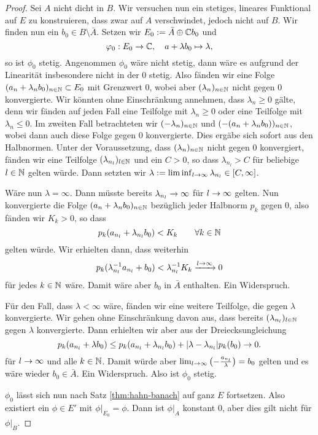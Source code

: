 \begin{proof}
  Sei $A$ nicht dicht in $B$. Wir versuchen nun ein stetiges, lineares
  Funktional auf $E$ zu konstruieren, dass zwar auf $A$ verschwindet,
  jedoch nicht auf $B$. Wir finden nun ein $b_0 \in B \setminus
  \bar A$. Setzen wir $E_0 := \bar A \oplus \mathbb{C} b_0$ und
  \[
  \varphi_0: E_0 \rightarrow \mathbb{C}, \quad a + \lambda b_0 \mapsto \lambda,
  \]
  so ist $\phi_0$ stetig. Angenommen $\phi_0$ wäre nicht stetig, dann
  wäre es aufgrund der Linearität insbesondere nicht in der $0$
  stetig. Also fänden wir eine Folge $(a_n + \lambda_n b_0)_{n \in
    \mathbb{N}} \subset E_0$ mit Grenzwert $0$, wobei aber $(\lambda_n)_{n \in
    \mathbb{N}}$ nicht gegen 0 konvergierte. Wir könnten ohne Einschränkung
  annehmen, dass $\lambda_n \geq 0$ gälte, denn wir fänden auf jeden Fall
  eine Teilfolge mit $\lambda_n \geq 0$ oder eine Teilfolge mit
  $\lambda_n \leq 0$. Im zweiten Fall betrachteten wir $(-\lambda_n)_{n
    \in \mathbb{N}}$ und $(-(a_n + \lambda_n b_0))_{n \in \mathbb{N}}$, wobei dann auch
  diese Folge gegen $0$ konvergierte. Dies ergäbe sich sofort aus den
  Halbnormen. Unter der Voraussetzung, dass $(\lambda_n)_{n\in\mathbb{N}}$
  nicht gegen $0$ konvergiert, fänden wir eine Teilfolge
  $(\lambda_{n_l})_{l\in \mathbb{N}}$ und ein $C > 0$, so dass $\lambda_{n_l}
  > C$ für beliebige $l \in \mathbb{N}$ gelten würde. Dann setzten wir
  $\lambda := \liminf_{l \rightarrow \infty} \lambda_{n_l} \in [C, \infty]$.

  Wäre nun $\lambda = \infty$. Dann müsste bereits
  $\lambda_{n_l} \rightarrow \infty$ für $l \rightarrow \infty$ gelten. Nun
  konvergierte die Folge $(a_n + \lambda_n b_0)_{n \in \mathbb{N}}$ bezüglich
  jeder Halbnorm $p_k$ gegen 0, also fänden wir $K_k > 0$, so dass
  \[
  p_k(a_{n_l} + \lambda_{n_l}b_0) < K_k \qquad \forall k \in \mathbb{N}
  \]
  gelten würde. Wir erhielten dann, dass weiterhin
  \[
  p_k(\lambda_{n_l}^{-1}a_{n_l} + b_0) < \lambda_{n_l}^{-1} K_k
  \xrightarrow{l \rightarrow \infty} 0
  \]
  für jedes $k \in \mathbb{N}$ wäre. Damit wäre aber $b_0$ in $\bar A$ enthalten. Ein
  Widerspruch.

  Für den Fall, dass $\lambda < \infty$ wäre, fänden wir eine weitere
  Teilfolge, die gegen $\lambda$ konvergierte. Wir gehen ohne
  Einschränkung davon aus, dass bereits $(\lambda_{n_l})_{l \in \mathbb{N}}$
  gegen $\lambda$ konvergierte. Dann erhielten wir aber aus der
  Dreiecksungleichung
  \[
  p_k(a_{n_l} + \lambda b_0) \leq p_k(a_{n_l} + \lambda_{n_l} b_0) +
  |\lambda - \lambda_{n_l}| p_k(b_0) \rightarrow 0.
  \]
  für $l \rightarrow \infty$ und alle $k \in \mathbb{N}$. Damit würde aber $\lim_{l
    \rightarrow \infty}\left (-\frac{a_{n_l}}{\lambda} \right ) =  b_0$ gelten und es wäre wieder
  $b_0 \in \bar A$. Ein Widerspruch. Also ist $\phi_0$ stetig.
  
  $\phi_0$ lässt sich nun nach Satz \ref{thm:hahn-banach}
  auf ganz $E$ fortsetzen. Also existiert ein $\phi \in E'$ mit
  $\phi|_{E_0} = \phi$. Dann ist $\phi|_A$ konstant 0, aber
  dies gilt nicht für $\phi|_B$.
\end{proof}

